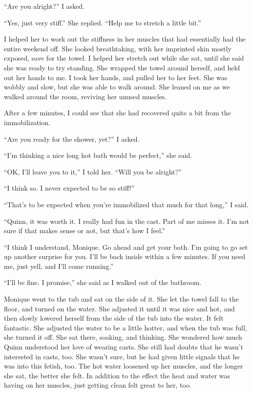 ``Are you alright?'' I asked.

``Yes, just very stiff.'' She replied. ``Help me to stretch a little bit.''

I helped her to work out the stiffness in her muscles that had essentially had the entire
weekend off. She looked breathtaking, with her imprinted skin mostly exposed, save for the
towel. I helped her stretch out while she sat, until she said she was ready to try standing. She
wrapped the towel around herself, and held out her hands to me. I took her hands, and pulled her
to her feet. She was wobbly and slow, but she was able to walk around. She leaned on me as we
walked around the room, reviving her unused muscles.

After a few minutes, I could see that she had recovered quite a bit from the
immobilization.

``Are you ready for the shower, yet?'' I asked.

``I'm thinking a nice long hot bath would be perfect,'' she said.

``OK, I'll leave you to it,'' I told her. ``Will you be alright?''

``I think so. I never expected to be so stiff!''

``That's to be expected when you're immobilized that much for that long,'' I said.

``Quinn, it was worth it. I really had fun in the cast. Part of me misses it. I'm not sure
if that makes sense or not, but that's how I feel.''

``I think I understand, Monique. Go ahead and get your bath. I'm going to go set up
another surprise for you. I'll be back inside within a few minutes. If you need me, just yell,
and I'll come running.''

``I'll be fine. I promise,'' she said as I walked out of the bathroom.

\begin{thought}
Monique went to the tub and sat on the side of it. She let the towel fall to the floor,
and turned on the water. She adjusted it until it was nice and hot, and then slowly lowered
herself from the side of the tub into the water. It felt fantastic. She adjusted the water to be
a little hotter, and when the tub was full, she turned it off. She sat there, soaking, and
thinking. She wondered how much Quinn understood her love of wearing casts. She still had doubts
that he wasn't interested in casts, too. She wasn't sure, but he had given little signals that
he was into this fetish, too. The hot water loosened up her muscles, and the longer she sat, the
better she felt. In addition to the effect the heat and water was having on her muscles, just
getting clean felt great to her, too.
\end{thought}

